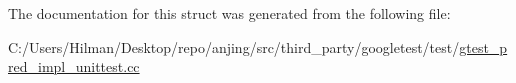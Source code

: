The documentation for this struct was generated from the following file\+:\begin{DoxyCompactItemize}
\item 
C\+:/\+Users/\+Hilman/\+Desktop/repo/anjing/src/third\+\_\+party/googletest/test/\hyperlink{gtest__pred__impl__unittest_8cc}{gtest\+\_\+pred\+\_\+impl\+\_\+unittest.\+cc}\end{DoxyCompactItemize}
